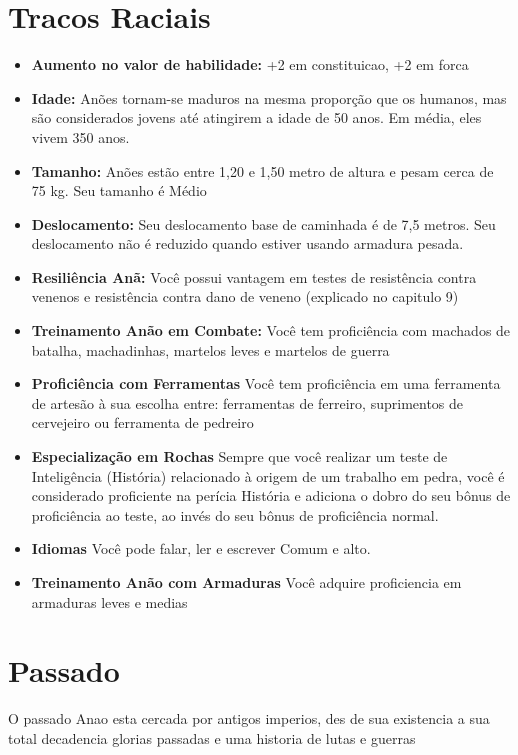 \documentclass{book}
\begin{document}
\section{Tracos Raciais}
\begin{itemize}
    \item \textbf{Aumento no valor de habilidade:} +2 em constituicao, +2 em forca
    \item \textbf{Idade:} Anões tornam-se maduros na mesma proporção que os humanos, mas são
          considerados jovens até atingirem a idade de 50 anos. Em média, eles vivem 350 anos.
    \item \textbf{Tamanho:} Anões estão entre 1,20 e 1,50 metro de altura e pesam cerca de 
          75 kg. Seu tamanho é Médio
    \item \textbf{Deslocamento:} Seu deslocamento base de caminhada é de 7,5 metros. Seu 
          deslocamento
          não é reduzido quando estiver usando armadura pesada.
       \item \textbf{Resiliência Anã:} Você possui vantagem em testes de resistência contra    
          venenos  e resistência contra dano de veneno (explicado no capitulo 9)
    \item \textbf{Treinamento Anão em Combate:} Você tem proficiência com machados de 
          batalha, machadinhas, martelos leves e martelos de guerra 
    \item \textbf{Proficiência com Ferramentas} Você tem proficiência em uma ferramenta de 
          artesão à sua escolha entre: ferramentas de ferreiro, suprimentos de cervejeiro ou 
          ferramenta de pedreiro 
    \item \textbf{Especialização em Rochas} Sempre que você realizar um teste de Inteligência
          (História) relacionado à origem de um trabalho em pedra, você é considerado
          proficiente na perícia História e adiciona o dobro do seu bônus de proficiência 
          ao teste, ao invés do seu bônus de proficiência normal.
    \item \textbf{Idiomas} Você pode falar, ler e escrever Comum e alto.
    \item \textbf{Treinamento Anão com Armaduras} Você adquire proficiencia em armaduras leves 
          e medias
\end{itemize}

\section{Passado}
O passado Anao esta cercada por antigos imperios, des de sua existencia a sua total decadencia
glorias passadas e uma historia de lutas e guerras 
\end{document}
